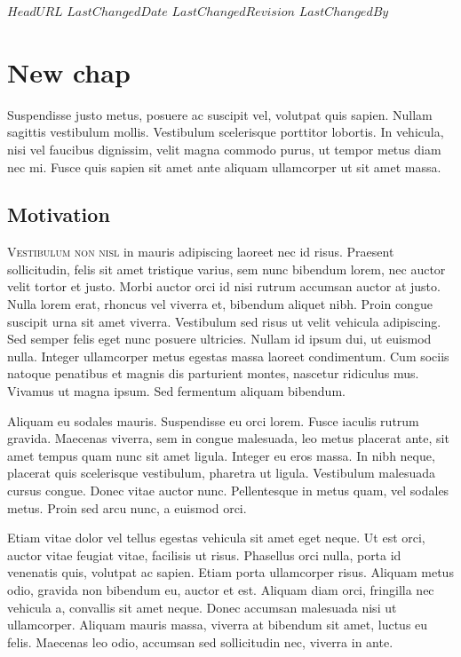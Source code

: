 \svnidlong
{$HeadURL$}
{$LastChangedDate$}
{$LastChangedRevision$}
{$LastChangedBy$}

\chapter{New chap}

\begin{introduction}
  Suspendisse justo metus, posuere ac suscipit vel, volutpat quis sapien. Nullam
  sagittis vestibulum mollis. Vestibulum scelerisque porttitor lobortis. In
  vehicula, nisi vel faucibus dignissim, velit magna commodo purus, ut tempor
  metus diam nec mi. Fusce quis sapien sit amet ante aliquam ullamcorper ut sit
  amet massa.
\end{introduction}



\section{Motivation}

\lettrine[nindent=-4pt]{V}{estibulum non nisl} in mauris adipiscing laoreet
nec id risus.  Praesent sollicitudin, felis sit amet tristique varius, sem nunc
bibendum lorem, nec auctor velit tortor et justo. Morbi auctor orci id nisi
rutrum accumsan auctor at justo. Nulla lorem erat, rhoncus vel viverra et,
bibendum aliquet nibh. Proin congue suscipit urna sit amet viverra. Vestibulum
sed risus ut velit vehicula adipiscing. Sed semper felis eget nunc posuere
ultricies. Nullam id ipsum dui, ut euismod nulla. Integer ullamcorper metus
egestas massa laoreet condimentum. Cum sociis natoque penatibus et magnis dis
parturient montes, nascetur ridiculus mus. Vivamus ut magna ipsum. Sed fermentum
aliquam bibendum.

Aliquam eu sodales mauris. Suspendisse eu orci lorem. Fusce iaculis rutrum
gravida. Maecenas viverra, sem in congue malesuada, leo metus placerat ante, sit
amet tempus quam nunc sit amet ligula. Integer eu eros massa. In nibh neque,
placerat quis scelerisque vestibulum, pharetra ut ligula. Vestibulum malesuada
cursus congue. Donec vitae auctor nunc. Pellentesque in metus quam, vel sodales
metus. Proin sed arcu nunc, a euismod orci.

Etiam vitae dolor vel tellus egestas vehicula sit amet eget neque. Ut est orci,
auctor vitae feugiat vitae, facilisis ut risus. Phasellus orci nulla, porta id
venenatis quis, volutpat ac sapien. Etiam porta ullamcorper risus. Aliquam metus
odio, gravida non bibendum eu, auctor et est. Aliquam diam orci, fringilla nec
vehicula a, convallis sit amet neque. Donec accumsan malesuada nisi ut
ullamcorper. Aliquam mauris massa, viverra at bibendum sit amet, luctus eu
felis. Maecenas leo odio, accumsan sed sollicitudin nec, viverra in ante.

